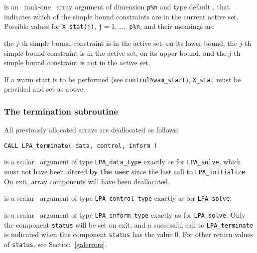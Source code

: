\documentclass{galahad}
\newcommand{\packagename}{LPA}
\begin{document}
\begin{description}
 is an \optional\ rank-one \intentout\ array argument of
dimension {\tt p\%n}
and type default \integer, that indicates which of the simple bound
constraints are in the current active set. Possible values for
{\tt X\_stat(j)}, {\tt j}$=1, \ldots ,$ {\tt p\%n}, and their meanings are
\begin{description}
 the $j$-th simple bound constraint
is in the active set, on its lower bound,
 the $j$-th simple bound constraint
is in the active set, on its upper bound, and
  the $j$-th simple bound constraint is not in the active set.
\end{description}
If a warm start is to be performed (see {\tt control\%wam\_start}),
{\tt X\_stat} must be provided and set as above.

\end{description}


\subsubsection{The  termination subroutine}
All previously allocated arrays are deallocated as follows:
\vspace*{1mm}

\hspace{8mm}
{\tt CALL \packagename\_terminate( data, control, inform )}

\vspace*{-3mm}
\begin{description}

 is a scalar \intentinout\ argument of type
{\tt \packagename\_data\_type}
exactly as for
{\tt \packagename\_solve},
which must not have been altered {\bf by the user} since the last call to
{\tt \packagename\_initialize}.
On exit, array components will have been deallocated.

 is a scalar \intentin\ argument of type
{\tt \packagename\_control\_type}
exactly as for
{\tt \packagename\_solve}.

 is a scalar \intentout\ argument of type
{\tt \packagename\_inform\_type}
exactly as for
{\tt \packagename\_solve}.
Only the component {\tt status} will be set on exit, and a
successful call to
{\tt \packagename\_terminate}
is indicated when this  component {\tt status} has the value 0.
For other return values of {\tt status}, see Section~\ref{galerrors}.

\end{description}
\end{document}

